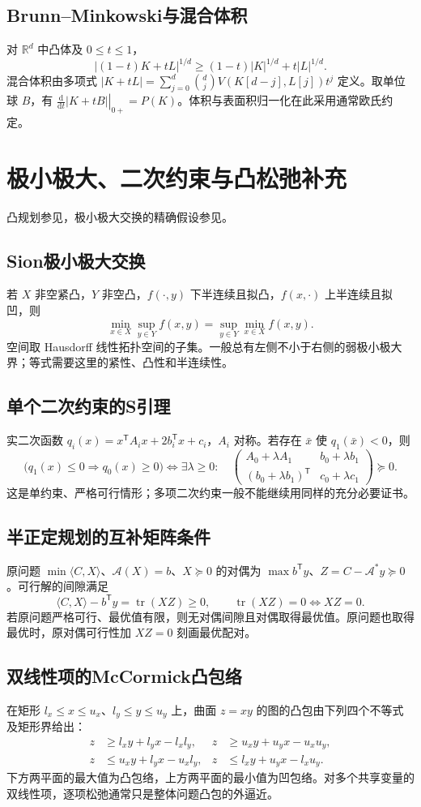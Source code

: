 \documentclass[../main.tex]{subfiles}
\begin{document}
\subsection{Brunn--Minkowski与混合体积}
对 $\mathbb R^d$ 中凸体及 $0\le t\le1$，
\[
|(1-t)K+tL|^{1/d}\ge(1-t)|K|^{1/d}+t|L|^{1/d}.
\]
混合体积由多项式 $|K+tL|=\sum_{j=0}^d\binom djV(K[d-j],L[j])t^j$ 定义。取单位球 $B$，有 $\left.\frac{\mathrm d}{\mathrm dt}|K+tB|\right|_{0+}=P(K)$。体积与表面积归一化在此采用通常欧氏约定。

\section{极小极大、二次约束与凸松弛补充}
凸规划参见\cite{boyd}，极小极大交换的精确假设参见\cite{sion}。
\subsection{Sion极小极大交换}
若 $X$ 非空紧凸，$Y$ 非空凸，$f(\cdot,y)$ 下半连续且拟凸，$f(x,\cdot)$ 上半连续且拟凹，则
\[
\min_{x\in X}\sup_{y\in Y}f(x,y)
=\sup_{y\in Y}\min_{x\in X}f(x,y).
\]
空间取 Hausdorff 线性拓扑空间的子集。一般总有左侧不小于右侧的弱极小极大界；等式需要这里的紧性、凸性和半连续性。
\subsection{单个二次约束的S引理}
实二次函数 $q_i(x)=x^{\mathsf T}A_ix+2b_i^{\mathsf T}x+c_i$，$A_i$ 对称。若存在 $\bar x$ 使 $q_1(\bar x)<0$，则
\[
\bigl(q_1(x)\le0\Rightarrow q_0(x)\ge0\bigr)
\iff\exists\lambda\ge0:\quad
\begin{pmatrix}A_0+\lambda A_1&b_0+\lambda b_1\\
(b_0+\lambda b_1)^{\mathsf T}&c_0+\lambda c_1\end{pmatrix}\succeq0.
\]
这是单约束、严格可行情形；多项二次约束一般不能继续用同样的充分必要证书。
\subsection{半正定规划的互补矩阵条件}
原问题 $\min\langle C,X\rangle$、$\mathcal A(X)=b$、$X\succeq0$ 的对偶为 $\max b^{\mathsf T}y$、$Z=C-\mathcal A^*y\succeq0$。可行解的间隙满足
\[
\langle C,X\rangle-b^{\mathsf T}y=\operatorname{tr}(XZ)\ge0,
\qquad\operatorname{tr}(XZ)=0\iff XZ=0.
\]
若原问题严格可行、最优值有限，则无对偶间隙且对偶取得最优值。原问题也取得最优时，原对偶可行性加 $XZ=0$ 刻画最优配对。
\subsection{双线性项的McCormick凸包络}
在矩形 $l_x\le x\le u_x$、$l_y\le y\le u_y$ 上，曲面 $z=xy$ 的图的凸包由下列四个不等式及矩形界给出：
\begin{align*}
z&\ge l_xy+l_yx-l_xl_y,&z&\ge u_xy+u_yx-u_xu_y,\\
z&\le u_xy+l_yx-u_xl_y,&z&\le l_xy+u_yx-l_xu_y.
\end{align*}
下方两平面的最大值为凸包络，上方两平面的最小值为凹包络。对多个共享变量的双线性项，逐项松弛通常只是整体问题凸包的外逼近。
\clearpage
\end{document}
